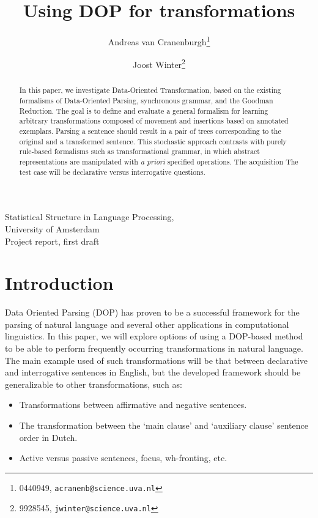 \documentclass[a4paper]{article}
\theoremstyle{definition}
\begin{document}
\title{Using DOP for transformations}
\author{Andreas van Cranenburgh\footnote{0440949, \texttt{acranenb@science.uva.nl}} 
\and Joost Winter\footnote{9928545, \texttt{jwinter@science.uva.nl}}}
\maketitle

\begin{center}
Statistical Structure in Language Processing, \\
University of Amsterdam \\
Project report, first draft
\end{center}

\vspace{5em}

\begin{abstract}
In this paper, we investigate Data-Oriented Transformation,
based on the existing formalisms of Data-Oriented Parsing, synchronous
grammar, and the Goodman Reduction. The goal is to define and evaluate a general
formalism for learning arbitrary transformations composed of movement and insertions
based on annotated exemplars.  Parsing a sentence should result in a pair of trees
corresponding to the original and a transformed sentence. 
This stochastic approach contrasts with purely rule-based formalisms such as
transformational grammar, in which abstract representations are manipulated
with {\em a priori} specified operations. The acquisition 
The test case will be declarative versus interrogative questions.
\end{abstract}

\newpage

\section{Introduction}

Data Oriented Parsing (DOP) has proven to be a successful framework for the
parsing of natural language and several other applications in computational
linguistics. In this paper, we will explore options of using a DOP-based method
to be able to perform frequently occurring transformations in natural language.
The main example used of such transformations will be that between declarative
and interrogative sentences in English, but the developed framework should be
generalizable to other transformations, such as:

\begin{itemize}
\item Transformations between affirmative and negative sentences.
\item The transformation between the `main clause' and `auxiliary clause'
	sentence order in Dutch.
\item Active versus passive sentences, focus, wh-fronting, etc.
\end{itemize}
\end{document}
